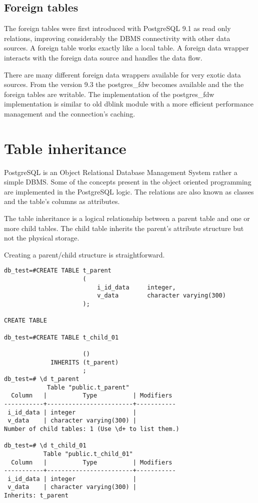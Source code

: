 \subsection{Foreign tables}
The foreign tables were first introduced with PostgreSQL 9.1 as read only relations, improving
considerably the DBMS connectivity with other data sources. A foreign table works exactly like a
local table. A foreign data wrapper interacts with the foreign data source and handles the
data flow.\newline

There are many different foreign data wrappers available for very exotic data sources. From the
version 9.3 the postgres\_fdw becomes available and the the foreign tables are writable. The
implementation of the postgres\_fdw implementation is similar to old dblink module with a more
efficient performance management and the connection's caching.

\section{Table inheritance}
PostgreSQL is an Object Relational Database Management System rather a simple DBMS. Some of the
concepts present in the object oriented programming are implemented in the PostgreSQL logic. The
relations are also known as classes and the table's columns as attributes. \newline

The table inheritance is a logical relationship between a parent table and one or more child
tables. The child table inherits the parent's attribute structure but not the physical
storage.\newline


Creating a parent/child structure is straightforward.

\begin{lstlisting}[style=pgsql]
db_test=#CREATE TABLE t_parent
                      (
                          i_id_data     integer,
                          v_data        character varying(300)
                      );

CREATE TABLE

db_test=#CREATE TABLE t_child_01

                      ()
             INHERITS (t_parent)
                      ;
db_test=# \d t_parent
            Table "public.t_parent"
  Column   |          Type          | Modifiers
-----------+------------------------+-----------
 i_id_data | integer                |
 v_data    | character varying(300) |
Number of child tables: 1 (Use \d+ to list them.)

db_test=# \d t_child_01
           Table "public.t_child_01"
  Column   |          Type          | Modifiers
-----------+------------------------+-----------
 i_id_data | integer                |
 v_data    | character varying(300) |
Inherits: t_parent

\end{lstlisting}

